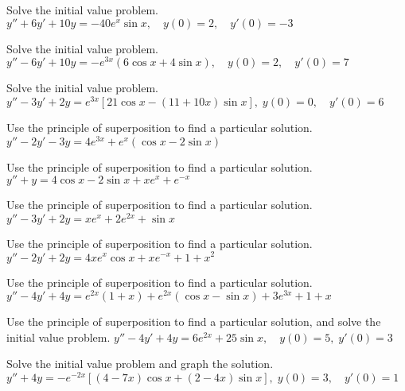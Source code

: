 \documentclass{ximera}
\begin{document}
\begin{problem}\label{exer:5.5.24} Solve the
initial value problem. $y''+6y'+10y=-40e^x\sin x, \quad  y(0)=2,\quad y'(0)=-3$
\end{problem}

\begin{problem}\label{exer:5.5.25} Solve the
initial value problem. $y''-6y'+10y=-e^{3x}(6\cos x+4\sin
x), \quad  y(0)=2,\quad y'(0)=7$
\end{problem}

\begin{problem}\label{exer:5.5.26}
Solve the
initial value problem. $y''-3y'+2y=e^{3x}\left[21\cos x-(11+10x)\sin x\right],
\;  y(0)=0, \quad   y'(0)=6$
\end{problem}

\begin{problem}\label{exer:5.5.27} Use the
principle
of superposition to find a particular solution. $y''-2y'-3y=4e^{3x}+e^x(\cos x-2\sin x)$
\end{problem}

\begin{problem}\label{exer:5.5.28} Use the
principle
of superposition to find a particular solution. $y''+y=4\cos x-2\sin x+xe^x+e^{-x}$
\end{problem}

\begin{problem}\label{exer:5.5.29} Use the
principle
of superposition to find a particular solution. $y''-3y'+2y=xe^x+2e^{2x}+\sin x$
\end{problem}

\begin{problem}\label{exer:5.5.30} Use the
principle
of superposition to find a particular solution. $y''-2y'+2y=4xe^x\cos x+xe^{-x}+1+x^2$
\end{problem}

\begin{problem}\label{exer:5.5.31} Use the
principle
of superposition to find a particular solution. $y''-4y'+4y=e^{2x}(1+x)+e^{2x}(\cos x-\sin
x)+3e^{3x}+1+x$
\end{problem}

\begin{problem}\label{exer:5.5.32}
Use the
principle
of superposition to find a particular solution, and
solve the initial value problem. $y''-4y'+4y=6e^{2x}+25\sin x , \quad   y(0)=5,\;  y'(0)=3$
\end{problem}

\begin{problem}\label{exer:5.5.33}
Solve the initial value problem and graph the solution. $y''+4y=-e^{-2x}\left[(4-7x)\cos x+(2-4x)\sin x\right],
\;  y(0)=3, \quad   y'(0)=1$
\end{problem}
\end{document}
